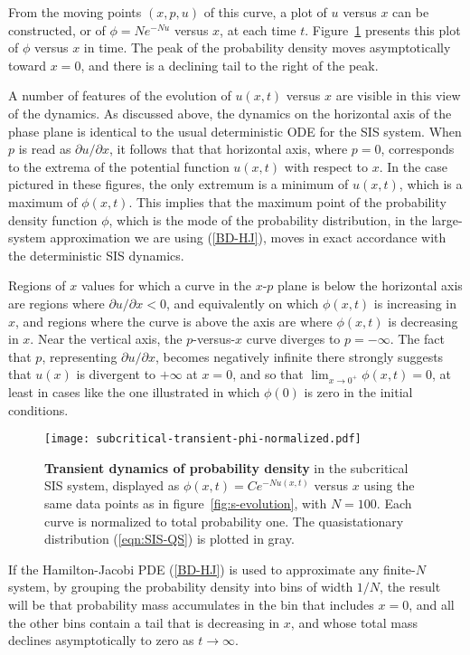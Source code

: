 \documentclass[review]{elsarticle}
\begin{document}
From the moving points $(x,p,u)$ of this curve,
a plot of $u$ versus $x$ can be constructed,
or of $\phi=Ne^{-Nu}$ versus $x$, at each time $t$.
Figure~\ref{fig:phi-vs-t} presents this plot of $\phi$ versus $x$
in time.
The peak of the probability density moves asymptotically toward $x=0$,
and there is a declining tail to the right of the peak.

A number of features of the evolution of $u(x,t)$ versus $x$ are visible in
this view of the dynamics.  As discussed above, the dynamics on the horizontal
axis of the phase plane
is identical to the usual deterministic ODE for the SIS system.
When $p$ is read as ${\partial u}/{\partial x}$, it follows that that
horizontal axis, where $p=0$, corresponds to the extrema of the potential function
$u(x,t)$ with respect to $x$.
In the case pictured in these figures,
the only extremum is a minimum of $u(x,t)$, which
is a maximum of $\phi(x,t)$.
This implies that the maximum point of
the probability density function $\phi$,
which is the mode of the probability distribution,
in the large-system approximation we are using (\ref{BD-HJ}),
moves in exact accordance with the deterministic SIS dynamics.

Regions of $x$ values for which a curve in the $x$-$p$ plane
is below the horizontal axis
are regions where ${\partial u}/{\partial x}<0$, and equivalently on which
$\phi(x,t)$ is increasing in $x$, and regions where the curve is above the axis
are where $\phi(x,t)$ is decreasing in $x$.
Near the vertical axis, the $p$-versus-$x$
curve diverges to $p=-\infty$.  The fact that $p$,
representing ${\partial u}/{\partial x}$,
becomes negatively infinite there strongly suggests that $u(x)$ is
divergent to $+\infty$ at $x=0$, and so that $\lim_{x\to0^+}\phi(x,t)=0$,
at least in cases
like the one illustrated in which $\phi(0)$ is zero in the initial
conditions.

\begin{figure}
\centering
\texttt{[image: subcritical-transient-phi-normalized.pdf]}
\caption{\label{fig:phi-vs-t}
{\bf Transient dynamics of probability density}
in the subcritical SIS system,
displayed as $\phi(x,t) = Ce^{-Nu(x,t)}$ versus $x$
using the same data points as in figure~\ref{fig:s-evolution},
with $N=100$.
Each curve is normalized to total probability one.
The quasistationary distribution (\ref{eqn:SIS-QS}) is plotted in gray.
}
\end{figure}

If the Hamilton-Jacobi PDE (\ref{BD-HJ}) is used
to approximate any finite-$N$ system, by grouping the
probability density into bins of width $1/N$, the result will be that
probability mass accumulates in the bin that includes $x=0$, and all the
other bins contain a tail that is decreasing in $x$, and whose
total mass declines asymptotically to zero as $t\to\infty$.
\end{document}

